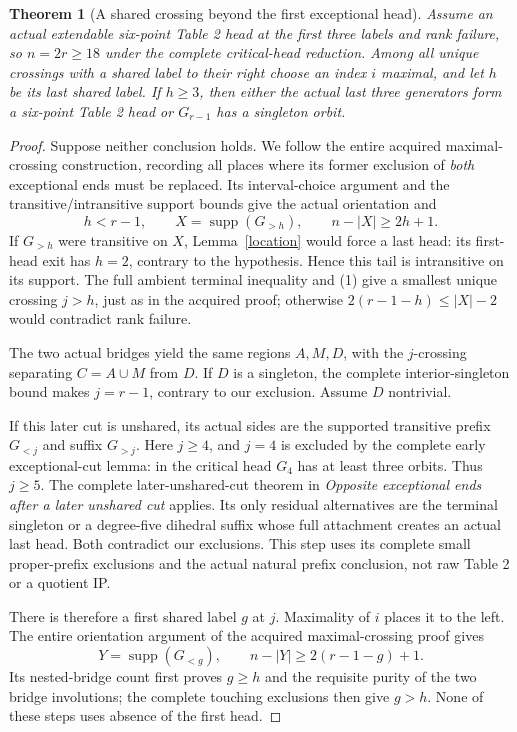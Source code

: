 \documentclass[11pt,a4paper]{article}
\newtheorem{theorem}[lemma]{Theorem}
\begin{document}
\begin{theorem}[A shared crossing beyond the first exceptional head]
\label{late}
Assume an actual extendable six-point Table 2 head at the first
three labels and rank failure, so $n=2r\ge18$ under the complete
critical-head reduction. Among all unique crossings with a shared
label to their right choose an index $i$ maximal, and let $h$ be
its last shared label. If $h\ge3$, then either the actual last three
generators form a six-point Table 2 head or $G_{r-1}$ has a singleton
orbit.
\end{theorem}
\begin{proof}
Suppose neither conclusion holds. We follow the entire acquired
maximal-crossing construction, recording all places where its former
exclusion of \emph{both} exceptional ends must be replaced.
Its interval-choice argument and the transitive/intransitive support
bounds give the actual orientation and
\[
 h<r-1,\qquad X=\operatorname{supp}(G_{>h}),\qquad
                       n-|X|\ge2h+1.                 \tag{1}
\]
If $G_{>h}$ were transitive on $X$, Lemma~\ref{location} would
force a last head: its first-head exit has $h=2$, contrary to the
hypothesis. Hence this tail is intransitive on its support.
The full ambient terminal inequality and (1) give a smallest
unique crossing $j>h$, just as in the acquired proof; otherwise
$2(r-1-h)\le |X|-2$ would contradict rank failure.

The two actual bridges yield the same regions $A,M,D$, with the
$j$-crossing separating $C=A\cup M$ from $D$. If $D$ is a
singleton, the complete interior-singleton bound makes $j=r-1$,
contrary to our exclusion. Assume $D$ nontrivial.

If this later cut is unshared, its actual sides are the supported
transitive prefix $G_{<j}$ and suffix $G_{>j}$. Here $j\ge4$,
and $j=4$ is excluded by the complete early exceptional-cut lemma:
in the critical head $G_4$ has at least three orbits. Thus $j\ge5$.
The complete later-unshared-cut theorem in
\emph{Opposite exceptional ends after a later unshared cut}
applies. Its only residual alternatives are the terminal singleton
or a degree-five dihedral suffix whose full attachment creates an
actual last head. Both contradict our exclusions. This step uses
its complete small proper-prefix exclusions and the actual natural
prefix conclusion, not raw Table 2 or a quotient IP.

There is therefore a first shared label $g$ at $j$. Maximality
of $i$ places it to the left. The entire orientation argument of the
acquired maximal-crossing proof gives
\[
 Y=\operatorname{supp}(G_{<g}),\qquad
                 n-|Y|\ge2(r-1-g)+1.                 \tag{2}
\]
Its nested-bridge count first proves $g\ge h$ and the requisite
purity of the two bridge involutions; the complete touching
exclusions then give $g>h$. None of these steps uses absence of
the first head.


\end{proof}
\end{document}
